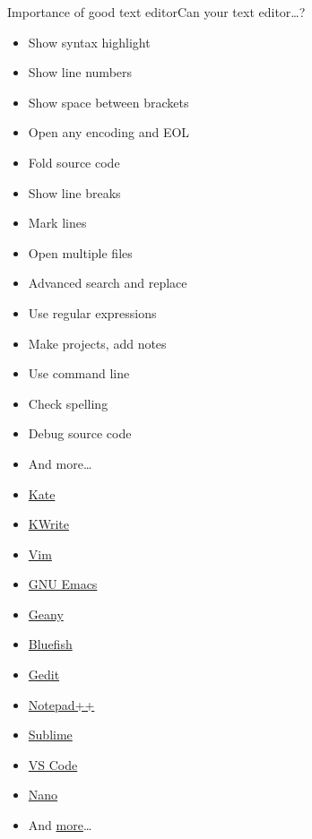 \documentclass[compress, ucs, xelatex, 11pt, xcolor=svgnames, aspectratio=169,
	hyperref={
		bookmarks=true,
		unicode=true,
		colorlinks=true,
		pdftitle={Linux, command line and MetaCentrum},
		plainpages=false,
		pdfauthor={Vojtech Zeisek},
		pdfsubject={Course about use of Linux command line, writing shell scripts and using MetaCentrum of CESNET},
		pdfcreator={XeLaTeX},
		pdfkeywords={Linux, GNU, BASH, shell, command line, MetaCentrum},
		linkcolor=DarkRed, %
		anchorcolor=DarkBlue, %
		citecolor=Indigo, %
		filecolor=NavyBlue, %
		menucolor=DarkMagenta, %
		urlcolor=DarkBlue, %
		pdftex},
	url={hyphens, lowtilde} %
	]{beamer}
\begin{document}
\begin{frame}{Importance of good text editor}{Can your text editor\ldots ?}
	\label{editors}
	\begin{multicols}{2}
		\begin{itemize}
			\item Show syntax highlight
			\item Show line numbers
			\item Show space between brackets
			\item Open any encoding and EOL
			\item Fold source code
			\item Show line breaks
			\item Mark lines
			\item Open multiple files
			\item Advanced search and replace
			\item Use regular expressions
			\item Make projects, add notes
			\item Use command line
			\item Check spelling
			\item Debug source code
			\item And more\ldots
		\end{itemize}
	\end{multicols}
	\begin{multicols}{4}
		\begin{itemize}
			\item \href{https://kate-editor.org/}{Kate}
			\item \href{https://apps.kde.org/kwrite}{KWrite}
			\item \href{https://www.vim.org/}{Vim}
			\item \href{https://www.gnu.org/software/emacs/}{GNU Emacs}
			\item \href{https://www.geany.org/}{Geany}
			\item \href{https://bluefish.openoffice.nl/}{Bluefish}
			\item \href{https://wiki.gnome.org/Apps/Gedit}{Gedit}
			\item \href{https://notepad-plus-plus.org/}{Notepad++}
			\item \href{https://www.sublimetext.com/}{Sublime}
			\item \href{https://code.visualstudio.com/}{VS Code}
			\item \href{https://www.nano-editor.org/}{Nano}
			\item And \href{https://en.wikipedia.org/wiki/List_of_text_editors}{more}\ldots
		\end{itemize}
	\end{multicols}
\end{frame}
\end{document}
